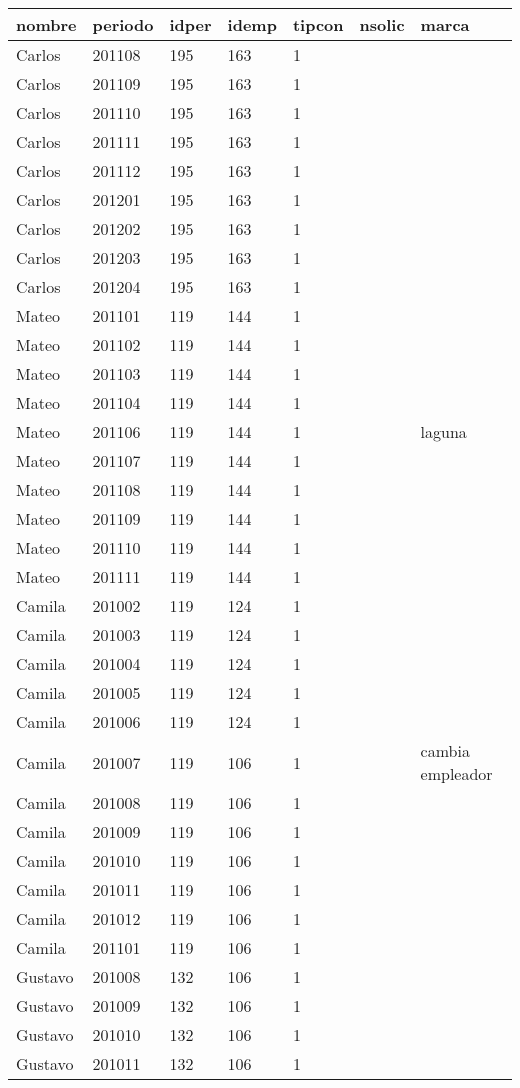 \begin{tabular}{m{30pt}<{\raggedrigth}*{5}{m{25pt}<{\centering}}m{80pt}<{\raggedleft}}
\toprule
nombre & periodo & idper & idemp & tipcon & nsolic & marca \\ \midrule
Carlos&201108&195&163&1&&\\
Carlos&201109&195&163&1&&\\
Carlos&201110&195&163&1&&\\
Carlos&201111&195&163&1&&\\
Carlos&201112&195&163&1&&\\
Carlos&201201&195&163&1&&\\
Carlos&201202&195&163&1&&\\
Carlos&201203&195&163&1&&\\
Carlos&201204&195&163&1&&\\
Mateo&201101&119&144&1&&\\
Mateo&201102&119&144&1&&\\
Mateo&201103&119&144&1&&\\
Mateo&201104&119&144&1&&\\
Mateo&201106&119&144&1&&laguna\\
Mateo&201107&119&144&1&&\\
Mateo&201108&119&144&1&&\\
Mateo&201109&119&144&1&&\\
Mateo&201110&119&144&1&&\\
Mateo&201111&119&144&1&&\\
Camila&201002&119&124&1&&\\
Camila&201003&119&124&1&&\\
Camila&201004&119&124&1&&\\
Camila&201005&119&124&1&&\\
Camila&201006&119&124&1&&\\
Camila&201007&119&106&1&&cambia empleador\\
Camila&201008&119&106&1&&\\
Camila&201009&119&106&1&&\\
Camila&201010&119&106&1&&\\
Camila&201011&119&106&1&&\\
Camila&201012&119&106&1&&\\
Camila&201101&119&106&1&&\\
Gustavo&201008&132&106&1&&\\
Gustavo&201009&132&106&1&&\\
Gustavo&201010&132&106&1&&\\
Gustavo&201011&132&106&1&&\\

\end{tabular}
